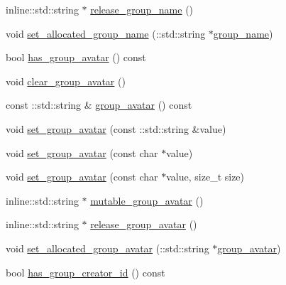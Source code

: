 \begin{DoxyCompactItemize}
\item 
inline\+::std\+::string $\ast$ \hyperlink{class_i_m_1_1_base_define_1_1_client_group_info_a20814cb4ef71c44566f3e1a6f6cd8c2d}{release\+\_\+group\+\_\+name} ()
\item 
void \hyperlink{class_i_m_1_1_base_define_1_1_client_group_info_ad2b5ace5215b19396bceeb2235e74566}{set\+\_\+allocated\+\_\+group\+\_\+name} (\+::std\+::string $\ast$\hyperlink{class_i_m_1_1_base_define_1_1_client_group_info_a63659cf89464b7b407fd30d261f8e35a}{group\+\_\+name})
\item 
bool \hyperlink{class_i_m_1_1_base_define_1_1_client_group_info_a0b489a6c42ad6bdbb3e110877b3ee4e0}{has\+\_\+group\+\_\+avatar} () const 
\item 
void \hyperlink{class_i_m_1_1_base_define_1_1_client_group_info_a115b42cbf229bc43fbee3f5396dd0e71}{clear\+\_\+group\+\_\+avatar} ()
\item 
const \+::std\+::string \& \hyperlink{class_i_m_1_1_base_define_1_1_client_group_info_a67f985b4b540959b2521da03420a18e3}{group\+\_\+avatar} () const 
\item 
void \hyperlink{class_i_m_1_1_base_define_1_1_client_group_info_a14467a4a9375b2254491ac3ebab66d5e}{set\+\_\+group\+\_\+avatar} (const \+::std\+::string \&value)
\item 
void \hyperlink{class_i_m_1_1_base_define_1_1_client_group_info_ac7a5f861243ce790262a4bd67217343e}{set\+\_\+group\+\_\+avatar} (const char $\ast$value)
\item 
void \hyperlink{class_i_m_1_1_base_define_1_1_client_group_info_a804d72338f6bd2c1891d98af6862aa96}{set\+\_\+group\+\_\+avatar} (const char $\ast$value, size\+\_\+t size)
\item 
inline\+::std\+::string $\ast$ \hyperlink{class_i_m_1_1_base_define_1_1_client_group_info_a6bfc0f7a1a0819ca115239497a6358e2}{mutable\+\_\+group\+\_\+avatar} ()
\item 
inline\+::std\+::string $\ast$ \hyperlink{class_i_m_1_1_base_define_1_1_client_group_info_aaa4c2990918d45af78dd14f98ab63213}{release\+\_\+group\+\_\+avatar} ()
\item 
void \hyperlink{class_i_m_1_1_base_define_1_1_client_group_info_ae2189e1da688da0a088c3b8e48bedcb3}{set\+\_\+allocated\+\_\+group\+\_\+avatar} (\+::std\+::string $\ast$\hyperlink{class_i_m_1_1_base_define_1_1_client_group_info_a67f985b4b540959b2521da03420a18e3}{group\+\_\+avatar})
\item 
bool \hyperlink{class_i_m_1_1_base_define_1_1_client_group_info_ac38b00d38d9ae6d94c2e990555ca2122}{has\+\_\+group\+\_\+creator\+\_\+id} () const 

\end{DoxyCompactItemize}
